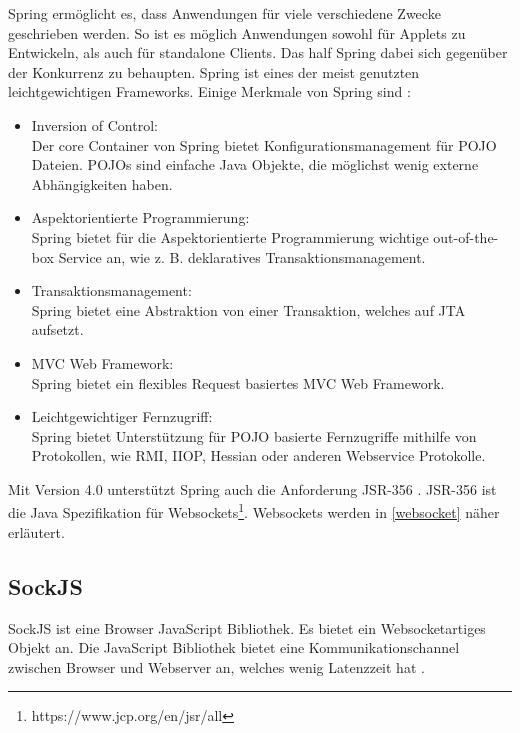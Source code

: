 Spring ermöglicht es, dass Anwendungen für viele verschiedene Zwecke geschrieben werden. So ist es möglich Anwendungen sowohl für Applets zu Entwickeln, als auch für standalone Clients. Das half Spring dabei sich gegenüber der Konkurrenz zu behaupten. Spring ist eines der meist genutzten leichtgewichtigen Frameworks. 
Einige Merkmale von Spring sind \cite[Seite 5]{johnson2005}:

\begin{itemize}
\item Inversion of Control:\\ Der core Container von Spring bietet Konfigurationsmanagement für \ac{POJO} Dateien. POJOs sind einfache Java Objekte, die möglichst wenig externe Abhängigkeiten haben. 
\\
\item Aspektorientierte Programmierung:\\ Spring bietet für die Aspektorientierte Programmierung wichtige out-of-the-box Service an, wie z. B. deklaratives Transaktionsmanagement.
\\
\item Transaktionsmanagement:\\ Spring bietet eine Abstraktion von einer Transaktion, welches auf \ac{JTA} aufsetzt.
\\
\item MVC Web Framework:\\ Spring bietet ein flexibles Request basiertes MVC Web Framework. 
\\
\item Leichtgewichtiger Fernzugriff:\\ Spring bietet Unterstützung für POJO basierte Fernzugriffe mithilfe von Protokollen, wie RMI, IIOP, Hessian oder anderen Webservice Protokolle.
\end{itemize}

Mit Version 4.0 unterstützt Spring auch die Anforderung JSR-356 \cite[Seite 14]{iuliana2017}. JSR-356 ist die Java Spezifikation für Websockets\footnote{https://www.jcp.org/en/jsr/all}. Websockets werden in \ref{websocket} näher erläutert.


\subsection{SockJS}

SockJS ist eine Browser JavaScript Bibliothek. Es bietet ein Websocketartiges Objekt an. Die JavaScript Bibliothek bietet eine Kommunikationschannel zwischen Browser und Webserver an, welches wenig Latenzzeit hat \cite{sockjs}.

